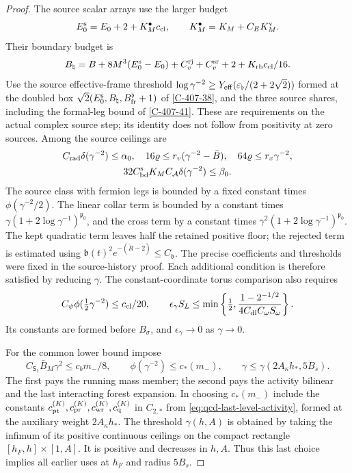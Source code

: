 \documentclass[11pt,letterpaper,reqno]{amsart}
\theoremstyle{definition}
\theoremstyle{remark}
\begin{document}
\begin{proof}
The source scalar arrays use the larger budget
\[
 E_0^{\rm s}=E_0+2+K_M^\bullet c_{\rm cl},\qquad
 K_M^\bullet=K_M+C_EK_M^{\rm v}.
\]
Their boundary budget is
\[
 B_\natural=B+8M^3(E_0^{\rm s}-E_0)
          +C_v^{\rm rj}+C_v^{\rm sr}+2+K_{\rm rb}c_{\rm cl}/16.
\]
Use the source effective-frame threshold
$\log\gamma^{-2}\ge Y_{\rm eff}(\varepsilon_\flat/(2+2\sqrt2))$
formed at the doubled box
$\sqrt2(E_0^{\rm s},B_\natural,B_{\rm fr}^{\flat}+1)$
of \cref{C-407-38}, and the three source shares, including
the formal-leg bound of \cref{C-407-41}. These are
requirements on the actual complex source step; its identity
does not follow from positivity at zero sources.
Among the source ceilings are
\[
\begin{gathered}
 C_{\rm rad}\delta(\gamma^{-2})\le\alpha_0,\quad
 16\varrho\le r_v(\gamma^{-2}-\bar B),\quad
 64\varrho\le r_x\gamma^{-2},\\
 32C_{\rm bd}^{\rm s}K_M C_{\mathcal A}
                         \delta(\gamma^{-2})\le\beta_0.
\end{gathered}
\]
The source class with fermion legs is bounded by a fixed
constant times $\phi(\gamma^{-2}/2)$. The linear collar
term is bounded by a constant times
$\gamma(1+2\log\gamma^{-1})^{\mathfrak p_0}$, and the
cross term by a constant times
$\gamma^2(1+2\log\gamma^{-1})^{\mathfrak p_0}$.
The kept quadratic term leaves half the retained positive
floor; the rejected term is estimated using
$\mathfrak b(t)^2e^{-(\check R-2)}\le C_{\mathfrak b}$.
The precise coefficients and thresholds were fixed in the
source-history proof. Each additional condition is therefore
satisfied by reducing $\gamma$.
The constant-coordinate torus comparison also requires
\[
 C_\psi\phi(\tfrac12\gamma^{-2})\le c_{\rm cl}/20,\qquad
 \epsilon_\gamma S_L\le
 \min\left\{\tfrac12,
       \frac{1-2^{-1/2}}{4C_{\rm dl}C_\omega S_\omega}\right\}.
\]
Its constants are formed before $B_\sigma$, and
$\epsilon_\gamma\to0$ as $\gamma\to0$.

For the common lower bound impose
\[
 C_{\mathsf S_1}\bar B_M\gamma^2\le c_bm_-/8,
 \qquad \phi(\gamma^{-2})\le c_*(m_-),
 \qquad \gamma\le\gamma(2A_\kappa h_*,5B_s).
\]
The first pays the running mass member; the second pays
the activity bilinear and the last interacting forest
expansion. In choosing $c_*(m_-)$ include the constants
$c_{\rm pt}^{(K)},c_{\rm pr}^{(K)},c_{\rm wr}^{(K)},c_{\rm q}^{(K)}$
in $C_{2,*}$ from \eqref{eq:qcd-last-level-activity},
formed at the auxiliary weight $2A_\kappa h_*$.
The threshold $\gamma(h,A)$ is obtained by
taking the infimum of its positive continuous ceilings
on the compact rectangle $[h_F,h]\times[1,A]$.
It is positive and decreases in $h,A$. Thus this last
choice implies all earlier uses at $h_F$ and radius $5B_s$.


\end{proof}
\end{document}
